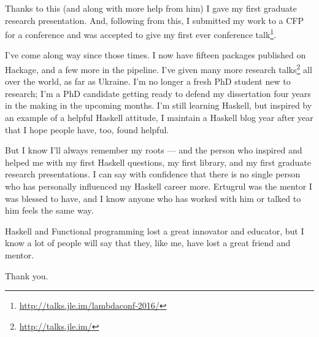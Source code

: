 \documentclass[]{article}
\renewcommand{\href}[2]{#2\footnote{\url{#1}}}
\begin{document}
Thanks to this (and along with more help from him) I gave my first graduate
research presentation. And, following from this, I submitted my work to a CFP
for a conference and was \href{http://talks.jle.im/lambdaconf-2016/}{accepted to
give my first ever conference talk}.

I've come along way since those times. I now have fifteen packages published on
Hackage, and a few more in the pipeline. I've given
\href{http://talks.jle.im/}{many more research talks} all over the world, as far
as Ukraine. I'm no longer a fresh PhD student new to research; I'm a PhD
candidate getting ready to defend my dissertation four years in the making in
the upcoming months. I'm still learning Haskell, but inspired by an example of a
helpful Haskell attitude, I maintain a Haskell blog year after year that I hope
people have, too, found helpful.

But I know I'll always remember my roots --- and the person who inspired and
helped me with my first Haskell questions, my first library, and my first
graduate research presentations. I can say with confidence that there is no
single person who has personally influenced my Haskell career more. Ertugrul was
the mentor I was blessed to have, and I know anyone who has worked with him or
talked to him feels the same way.

Haskell and Functional programming lost a great innovator and educator, but I
know a lot of people will say that they, like me, have lost a great friend and
mentor.

Thank you.
\end{document}

